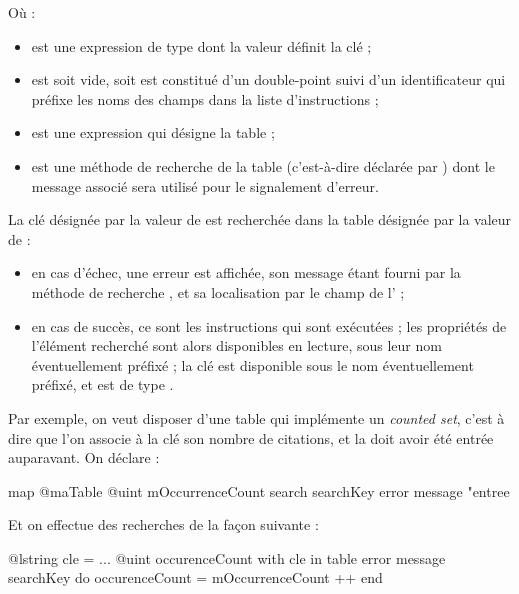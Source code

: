 {{{Où :
\begin{itemize}
  \item {} est une expression de type  dont la valeur définit la clé ;
  \item {} est soit vide, soit est constitué d'un double-point \galgast{:} suivi d'un identificateur qui préfixe les noms des champs dans la liste d'instructions  ;
  \item {} est une expression qui désigne la table ;
  \item {} est une méthode de recherche de la table (c'est-à-dire déclarée par ) dont le message associé sera utilisé pour le signalement d'erreur.
\end{itemize}

La clé désignée par la valeur de  est recherchée dans la table désignée par la valeur de  :
\begin{itemize}
  \item en cas d'échec, une erreur est affichée, son message étant fourni par la méthode de recherche , et sa localisation par le champ  de l' ;
  \item en cas de succès, ce sont les instructions  qui sont exécutées ; les propriétés de l'élément recherché sont alors disponibles en lecture, sous leur nom éventuellement préfixé ; la clé est disponible sous le nom  éventuellement préfixé, et est de type .
\end{itemize}

Par exemple, on veut disposer d'une table qui implémente un \emph{counted set}, c'est à dire que l'on associe à la clé son nombre de citations, et la doit avoir été entrée auparavant. On déclare :
\begin{galgascode}
map @maTable {
  @uint mOccurrenceCount
  search searchKey error message "entree %
}
\end{galgascode}

Et on effectue des recherches de la façon suivante :
\begin{galgascode}
@lstring cle = ...
@uint occurenceCount
with cle in table error message searchKey do
  occurenceCount = mOccurrenceCount ++
end
\end{galgascode}

}}}
